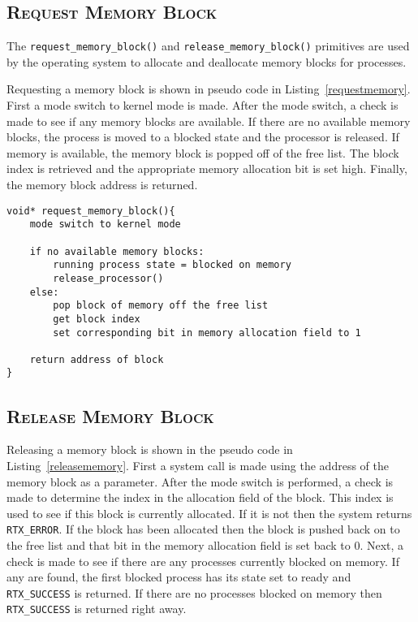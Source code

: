 \documentclass[oneside]{report}
\begin{document}
\subsection{\textsc{Request Memory Block}}
The \texttt{request\_memory\_block()} and \texttt{release\_memory\_block()}
primitives are used by the operating system to allocate and deallocate memory
blocks for processes.

Requesting a memory block is shown in pseudo code in
Listing~\ref{requestmemory}. First a mode switch to kernel mode is made. After
the mode switch, a check is made to see if any memory blocks are available. If
there are no available memory blocks, the process is moved to a blocked state
and the processor is released. If memory is available, the memory block is
popped off of the free list. The block index is retrieved and the appropriate memory
allocation bit is set high. Finally, the memory block address is returned.

\begin{lstlisting}
void* request_memory_block(){
    mode switch to kernel mode

    if no available memory blocks:
        running process state = blocked on memory
        release_processor()
    else:
        pop block of memory off the free list        
        get block index
        set corresponding bit in memory allocation field to 1

    return address of block
}
\end{lstlisting}

\subsection{\textsc{Release Memory Block}}
Releasing a memory block is shown in the pseudo code in
Listing~\ref{releasememory}. First a system call is made using the address of
the memory block as a parameter.  After the mode switch is performed, a check
is made to determine the index in the allocation field of the block. This index
is used to see if this block is currently allocated. If it is not then the
system returns \texttt{RTX\_ERROR}. If the block has been allocated then the
block is pushed back on to the free list and that bit in the memory allocation
field is set back to 0. Next, a check is made to see if there are any processes
currently blocked on memory. If any are found, the first blocked process has
its state set to ready and \texttt{RTX\_SUCCESS} is returned. If there are no
processes blocked on memory then \texttt{RTX\_SUCCESS} is returned right away.
\end{document}
